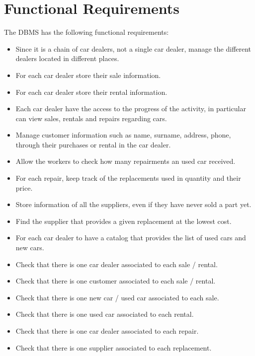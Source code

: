 \section{Functional Requirements}
The DBMS has the following functional requirements: 
\begin{itemize}
    \item Since it is a chain of car dealers, not a single car dealer, manage the different dealers located in different places.
    \item For each car dealer store their sale information.
    \item For each car dealer store their rental information.
    \item Each car dealer have the access to the progress of the activity, in particular can view sales, rentals and repairs regarding cars.
    \item Manage customer information such as name, surname, address, phone, through their purchases or rental in the car dealer.
    \item Allow the workers to check how many repairments an used car received.
    \item For each repair, keep track of the replacements used in quantity and their price.
    \item Store information of all the suppliers, even if they have never sold a part yet.
    \item Find the supplier that provides a given replacement at the lowest cost.
    \item For each car dealer to have a catalog that provides the list of used cars and new cars. 
    \item Check that there is one car dealer associated to each sale / rental. 
    \item Check that there is one customer associated to each sale / rental. 
    \item Check that there is one new car / used car associated to each sale. 
    \item Check that there is one used car associated to each rental. 
    \item Check that there is one car dealer associated to each repair. 
    \item Check that there is one supplier associated to each replacement. 
\end{itemize}
